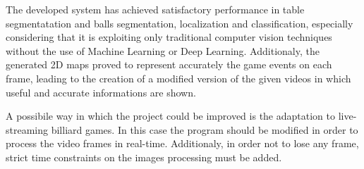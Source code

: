 The developed system has achieved satisfactory performance in table segmentatation and balls segmentation, localization and classification, 
especially considering that it is exploiting only traditional computer vision techniques without the use of Machine Learning or Deep Learning.
Additionaly, the generated 2D maps proved to represent accurately the game events on each frame, leading to the creation of a modified version
of the given videos in which useful and accurate informations are shown. 

A possibile way in which the project could be improved is the adaptation to live-streaming billiard games. In this case the program should be modified
in order to process the video frames in real-time. Additionaly, in order not to lose any frame, strict time constraints on the images processing must be added. 